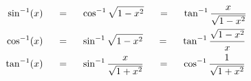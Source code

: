 \begin{align*}
\hspace{20mm} \sin^{-1}(x) \hspace{5mm} &= \hspace{5mm} \cos^{-1}\sqrt{1-x^2} \hspace{5mm} = \hspace{5mm}  \tan^{-1}\frac{x}{\sqrt{1-x^2}}\\
\hspace{20mm} \cos^{-1}(x) \hspace{5mm} &= \hspace{5mm} \sin^{-1}\sqrt{1-x^2} \hspace{5mm} = \hspace{5mm}  \tan^{-1}\frac{\sqrt{1-x^2}}{x}\\
\hspace{20mm} \tan^{-1}(x) \hspace{5mm} &= \hspace{5mm} \sin^{-1}\frac{x}{\sqrt{1+x^2}} \hspace{5mm} = \hspace{5mm}  \cos^{-1}\frac{1}{\sqrt{1+x^2}}
\end{align*}

 
